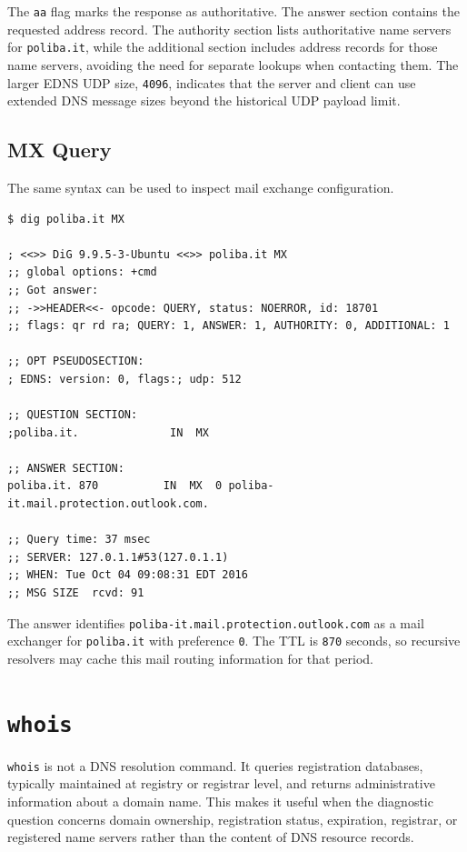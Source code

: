 \documentclass{scrbook}
\begin{document}
	The \texttt{aa} flag marks the response as authoritative. The answer section contains the requested address record. The authority section lists authoritative name servers for \texttt{poliba.it}, while the additional section includes address records for those name servers, avoiding the need for separate lookups when contacting them. The larger EDNS UDP size, \texttt{4096}, indicates that the server and client can use extended DNS message sizes beyond the historical UDP payload limit.
	
	\subsection{MX Query}
	
	The same syntax can be used to inspect mail exchange configuration.
	
	\begin{lstlisting}
$ dig poliba.it MX

; <<>> DiG 9.9.5-3-Ubuntu <<>> poliba.it MX
;; global options: +cmd
;; Got answer:
;; ->>HEADER<<- opcode: QUERY, status: NOERROR, id: 18701
;; flags: qr rd ra; QUERY: 1, ANSWER: 1, AUTHORITY: 0, ADDITIONAL: 1

;; OPT PSEUDOSECTION:
; EDNS: version: 0, flags:; udp: 512

;; QUESTION SECTION:
;poliba.it.              IN  MX

;; ANSWER SECTION:
poliba.it. 870          IN  MX  0 poliba-it.mail.protection.outlook.com.

;; Query time: 37 msec
;; SERVER: 127.0.1.1#53(127.0.1.1)
;; WHEN: Tue Oct 04 09:08:31 EDT 2016
;; MSG SIZE  rcvd: 91
	\end{lstlisting}
	
	The answer identifies \texttt{poliba-it.mail.protection.outlook.com} as a mail exchanger for \texttt{poliba.it} with preference \texttt{0}. The TTL is \texttt{870} seconds, so recursive resolvers may cache this mail routing information for that period.
	
	\newpage
	\section{\texttt{whois}}
	
	\texttt{whois} is not a DNS resolution command. It queries registration databases, typically maintained at registry or registrar level, and returns administrative information about a domain name. This makes it useful when the diagnostic question concerns domain ownership, registration status, expiration, registrar, or registered name servers rather than the content of DNS resource records.
	
\end{document}
